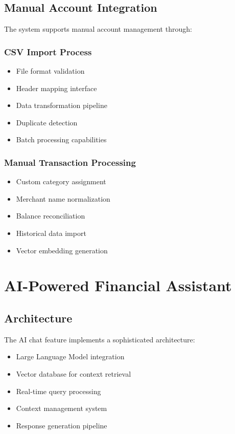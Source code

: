 \documentclass[conference]{IEEEtran}
\begin{document}
\subsection{Manual Account Integration}
The system supports manual account management through:

\subsubsection{CSV Import Process}
\begin{itemize}
\item File format validation
\item Header mapping interface
\item Data transformation pipeline
\item Duplicate detection
\item Batch processing capabilities
\end{itemize}

\subsubsection{Manual Transaction Processing}
\begin{itemize}
\item Custom category assignment
\item Merchant name normalization
\item Balance reconciliation
\item Historical data import
\item Vector embedding generation
\end{itemize}

\section{AI-Powered Financial Assistant}
\subsection{Architecture}
The AI chat feature implements a sophisticated architecture:
\begin{itemize}
\item Large Language Model integration
\item Vector database for context retrieval
\item Real-time query processing
\item Context management system
\item Response generation pipeline
\end{itemize}
\end{document}
